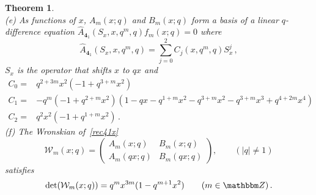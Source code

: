 \documentclass[12pt,reqno]{amsart}
\newtheorem{theorem}{Theorem}
\theoremstyle{definition}
\def\BZ{\mathbbm Z}
\def\calW{\mathcal W}
\def\md{\mathbf}
\newcommand{\knot}[1]{\md{#1}}
\begin{document}
\begin{theorem}
\begin{equation}
  \end{equation}
  \rm{(e)} As functions of $x$, $A_m(x;q)$ and $B_m(x;q)$ form a basis
  of a linear $q$-difference equation
  $\hat A_{\knot{4}_1} (S_x,x,q^m,q) f_m(x;q) =0$
where 
  \begin{equation}
    \label{rec41x}
    \hat A_{\knot{4}_1} (S_x,x,q^m,q) = \sum_{j=0}^2 C_j(x,q^m,q) S_x^j \,,
  \end{equation}
  $S_x$ is the operator that shifts $x$ to $qx$ and
  \begin{subequations}
    \begin{align}
      \label{rec41x0}
      C_0 =
      &q^{2 + 3 m} x^2 (-1 + q^{3 + m} x^2) \\
      \label{rec41x1}
      C_1 =
      & -q^m (-1 + q^{2 + m} x^2) (1 - q x - q^{1 + m} x^2 - q^{3 + m} x^2 - 
        q^{3 + m} x^3 + q^{4 + 2 m} x^4) \\ 
      \label{rec41x2}
      C_2 =
      & q^2 x^2 (-1 + q^{1 + m} x^2) \,.
    \end{align}
  \end{subequations}
  \rm{(f)} The Wronskian of~\eqref{rec41x}
  \begin{equation}
    \label{W41x}
    \calW_m(x;q) = \begin{pmatrix}
      A_{m}(x;q) & B_{m}(x;q)  \\
      A_{m}(qx;q) & B_{m}(qx;q) 
    \end{pmatrix}, \qquad (|q| \neq 1)
  \end{equation}
  satisfies
  \begin{equation}
    \label{detW41x}
    \det(\calW_m(x;q)) = q^m x^{3m}(1-q^{m+1} x^2) \qquad (m \in \BZ) \,.
  \end{equation}
\end{theorem}
\end{document}
